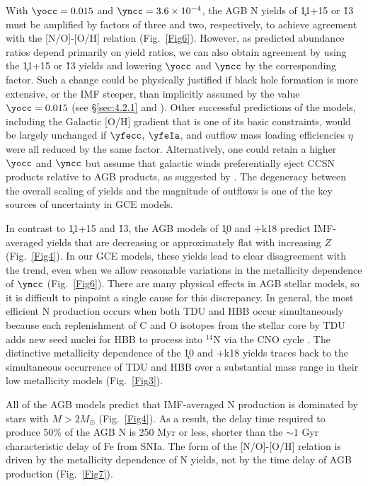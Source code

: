 With $\yocc = 0.015$ and $\yncc=3.6 \times 10^{-4}$, the AGB N yields of
\c11+15 or \v13 must be amplified by factors of three and two, respectively,
to achieve agreement with the \cite{Dopita2016} [N/O]-[O/H] relation
(Fig.~\ref{Fig6}).  However, as predicted abundance ratios depend primarily
on yield ratios, we can also obtain agreement by using the \c11+15 or \v13
yields and lowering $\yocc$ and $\yncc$ by the corresponding factor.
Such a change could be physically justified if black hole formation is
more extensive, or the IMF steeper, than implicitly assumed by the
value $\yocc=0.015$ (see \S\ref{sec:4.2.1} and \citealt{Griffith2021}).
Other successful predictions of the \cite{Johnson2021} models, including
the Galactic [O/H] gradient that is one of its basic constraints,
would be largely unchanged if $\yfecc$, $\yfeIa$, and outflow mass loading
efficiencies $\eta$ were all reduced by the same factor.  Alternatively,
one could retain a higher $\yocc$ and $\yncc$ but assume that galactic
winds preferentially eject CCSN products relative to AGB products, as 
suggested by \cite{Vincenzo2016}.  The degeneracy between the overall scaling
of yields and the magnitude of outflows is one of the key sources of 
uncertainty in GCE models.

In contrast to \c11+15 and \v13, the AGB models of \k10 and +k18 predict
IMF-averaged yields that are decreasing or approximately flat with 
increasing $Z$ (Fig.~\ref{Fig4}).  In our GCE models, these yields lead to
clear disagreement with the \cite{Dopita2016} trend, even when we allow
reasonable variations in the metallicity dependence of $\yncc$ (Fig.~\ref{Fig6}).
There are many physical effects in AGB stellar models, so it is difficult
to pinpoint a single cause for this discrepancy.  In general, the most
efficient N production occurs when both TDU and HBB occur simultaneously
because each replenishment of C and O isotopes from the stellar core by TDU
adds new seed nuclei for HBB to process into $^{14}$N via the CNO cycle
\citep{Ventura2013}.  The distinctive metallicity dependence of the 
\k10 and +k18 yields traces back to the simultaneous occurrence of
TDU and HBB over a substantial mass range in their low metallicity models
(Fig.~\ref{Fig3}).

All of the AGB models predict that IMF-averaged N production is dominated by
stars with $M>2 M_\odot$ (Fig.~\ref{Fig4}).  As a result, the delay time
required to produce 50\% of the AGB N is 250 Myr or less, shorter than
the $\sim 1$ Gyr characteristic delay of Fe from SNIa.  The form of the
[N/O]-[O/H] relation is driven by the metallicity dependence of N yields, 
not by the time delay of AGB production (Fig.~\ref{Fig7}).

